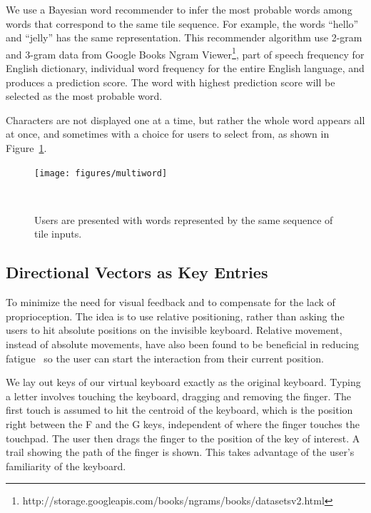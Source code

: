We use a Bayesian word recommender to infer the most probable words among words that correspond to the same tile sequence.  For example, the words ``hello'' and ``jelly'' has the same representation.  
This recommender algorithm use 2-gram and 3-gram data from Google Books Ngram Viewer\footnote{http://storage.googleapis.com/books/ngrams/books/datasetsv2.html}, part of speech frequency for English dictionary, individual word frequency for the entire English language, and produces a prediction score.
The word with highest prediction score will be selected as the most probable word.

Characters are not displayed one at a time, but rather the whole word appears all at once, and sometimes with a choice for users to select from, as shown in Figure~\ref{fig:multiword}.


\begin{figure}
  \centering

  \texttt{[image: figures/multiword]}
  
  \caption{Users are presented with words represented by the same sequence of tile inputs.}
  ~\label{fig:multiword}
\end{figure}




\subsection{Directional Vectors as Key Entries}

To minimize the need for visual feedback and to  
compensate for the lack of proprioception.  
The idea is to use relative positioning, rather than asking the users to hit absolute positions on the invisible keyboard. Relative movement, instead of absolute movements, have also been found to be beneficial in reducing fatigue~\cite{Hincapie-Ramos:2014:CEM:2556288.2557130} so the user can start the interaction from their current position. 

We lay out keys of our virtual keyboard exactly as the original keyboard.  Typing a letter involves touching the keyboard, dragging and removing the finger.  The first touch is assumed to hit the centroid of the keyboard, which is the position right between the F and the G keys, independent of where the finger touches the touchpad.  The user then drags the finger to the position of the key of interest.  A trail showing the path of the finger is shown.   This takes advantage of the user’s familiarity of the keyboard.  

